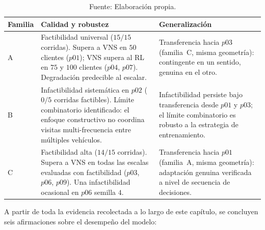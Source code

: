 \begin{table}[H]
    \centering
    \caption{\label{tab:sintesis-familias} Síntesis de los resultados por familia estructural.}
    \caption*{Fuente: Elaboración propia.}
    \small
    \renewcommand{\arraystretch}{1.18}
    \setlength{\tabcolsep}{7pt}
    \begin{tabularx}{\textwidth}{@{}>{\centering\arraybackslash}p{1.5cm}XX@{}}
        \toprule
        \textbf{Familia} & \textbf{Calidad y robustez} & \textbf{Generalización} \\
        \midrule
        A & Factibilidad universal ($15/15$ corridas). Supera a VNS en $50$ clientes ($p01$); VNS supera al RL en $75$ y $100$ clientes ($p04$, $p07$). Degradación predecible al escalar. & Transferencia hacia $p03$ (familia~C, misma geometría): contingente en un sentido, genuina en el otro. \\
        \midrule
        B & Infactibilidad sistemática en $p02$ ($0/5$ corridas factibles). Límite combinatorio identificado: el enfoque constructivo no coordina visitas multi-frecuencia entre múltiples vehículos. & Infactibilidad persiste bajo transferencia desde $p01$ y $p03$; el límite combinatorio es robusto a la estrategia de entrenamiento. \\
        \midrule
        C & Factibilidad alta ($14/15$ corridas). Supera a VNS en todas las escalas evaluadas con factibilidad ($p03$, $p06$, $p09$). Una infactibilidad ocasional en $p06$ semilla $4$. & Transferencia hacia $p01$ (familia~A, misma geometría): adaptación genuina verificada a nivel de secuencia de decisiones. \\
        \bottomrule
    \end{tabularx}
\end{table}

A partir de toda la evidencia recolectada a lo largo de este capítulo, se concluyen seis afirmaciones sobre el desempeño del modelo:

